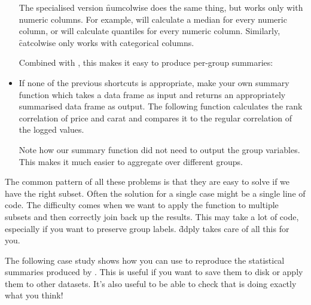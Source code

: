 \begin{itemize}
   The specialised version \f{numcolwise} does the same thing, but works only with numeric columns.  For example,  will calculate a median for every numeric column, or  will calculate quantiles for every numeric column.  Similarly, \f{catcolwise} only works with categorical columns.
  
    
  
  Combined with , this makes it easy to produce per-group summaries:
  
    
  
  \item If none of the previous shortcuts is appropriate, make your own summary function which takes a data frame as input and returns an appropriately summarised data frame as output.  The following function calculates the rank correlation of price and carat and compares it to the regular correlation of the logged values.
  
    
  
  Note how our summary function did not need to output the group variables.  This makes it much easier to aggregate over different groups.
\end{itemize}

The common pattern of all these problems is that they are easy to solve if we have the right subset. Often the solution for a single case might be a single line of code. The difficulty comes when we want to apply the function to multiple subsets and then correctly join back up the results. This may take a lot of code, especially if you want to preserve group labels. \f{ddply} takes care of all this for you.

The following case study shows how you can use  to reproduce the statistical summaries produced by \ggplot.  This is useful if you want to save them to disk or apply them to other datasets.  It's also useful to be able to check that \ggplot is doing exactly what you think!

